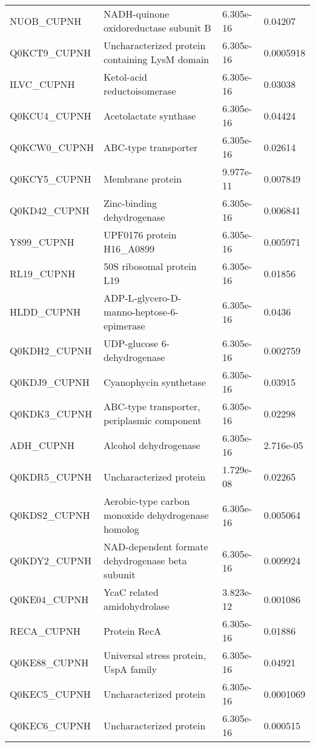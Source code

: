 \begin{center}
\begin{longtable}{ l l l l }
NUOB\_CUPNH & NADH-quinone oxidoreductase subunit B& 6.305e-16 & 0.04207 \\ [0.5ex]
Q0KCT9\_CUPNH & Uncharacterized protein containing LysM domain& 6.305e-16 & 0.0005918 \\ [0.5ex]
ILVC\_CUPNH & Ketol-acid reductoisomerase& 6.305e-16 & 0.03038 \\ [0.5ex]
Q0KCU4\_CUPNH & Acetolactate synthase& 6.305e-16 & 0.04424 \\ [0.5ex]
Q0KCW0\_CUPNH & ABC-type transporter & 6.305e-16 & 0.02614 \\ [0.5ex]
Q0KCY5\_CUPNH & Membrane protein& 9.977e-11 & 0.007849 \\ [0.5ex]
Q0KD42\_CUPNH & Zinc-binding dehydrogenase& 6.305e-16 & 0.006841 \\ [0.5ex]
Y899\_CUPNH & UPF0176 protein H16\_A0899& 6.305e-16 & 0.005971 \\ [0.5ex]
RL19\_CUPNH & 50S ribosomal protein L19& 6.305e-16 & 0.01856 \\ [0.5ex]
HLDD\_CUPNH & ADP-L-glycero-D-manno-heptose-6-epimerase& 6.305e-16 & 0.0436 \\ [0.5ex]
Q0KDH2\_CUPNH & UDP-glucose 6-dehydrogenase& 6.305e-16 & 0.002759 \\ [0.5ex]
Q0KDJ9\_CUPNH & Cyanophycin synthetase& 6.305e-16 & 0.03915 \\ [0.5ex]
Q0KDK3\_CUPNH & ABC-type transporter, periplasmic component & 6.305e-16 & 0.02298 \\ [0.5ex]
ADH\_CUPNH & Alcohol dehydrogenase& 6.305e-16 & 2.716e-05 \\ [0.5ex]
Q0KDR5\_CUPNH & Uncharacterized protein& 1.729e-08 & 0.02265 \\ [0.5ex]
Q0KDS2\_CUPNH & Aerobic-type carbon monoxide dehydrogenase homolog & 6.305e-16 & 0.005064 \\ [0.5ex]
Q0KDY2\_CUPNH & NAD-dependent formate dehydrogenase beta subunit& 6.305e-16 & 0.009924 \\ [0.5ex]
Q0KE04\_CUPNH & YcaC related amidohydrolase& 3.823e-12 & 0.001086 \\ [0.5ex]
RECA\_CUPNH & Protein RecA& 6.305e-16 & 0.01886 \\ [0.5ex]
Q0KE88\_CUPNH & Universal stress protein, UspA family& 6.305e-16 & 0.04921 \\ [0.5ex]
Q0KEC5\_CUPNH & Uncharacterized protein& 6.305e-16 & 0.0001069 \\ [0.5ex]
Q0KEC6\_CUPNH & Uncharacterized protein& 6.305e-16 & 0.000515 \\ [0.5ex]

\end{longtable}
\end{center}
